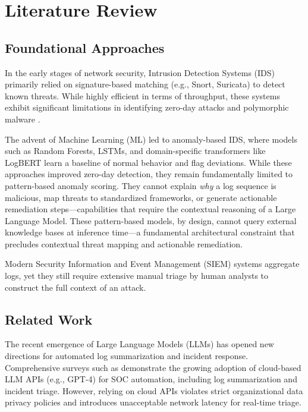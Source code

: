 \documentclass[12pt,a4paper]{article}
\begin{document}
\newpage
\section{Literature Review}

\subsection{Foundational Approaches}
In the early stages of network security, Intrusion Detection Systems (IDS) primarily relied on signature-based matching (e.g., Snort, Suricata) to detect known threats. While highly efficient in terms of throughput, these systems exhibit significant limitations in identifying zero-day attacks and polymorphic malware \cite{khraisat2019}.

The advent of Machine Learning (ML) led to anomaly-based IDS, where models such as Random Forests, LSTMs, and domain-specific transformers like LogBERT \cite{logbert2021} learn a baseline of normal behavior and flag deviations. While these approaches improved zero-day detection, they remain fundamentally limited to pattern-based anomaly scoring. They cannot explain \textit{why} a log sequence is malicious, map threats to standardized frameworks, or generate actionable remediation steps—capabilities that require the contextual reasoning of a Large Language Model. These pattern-based models, by design, cannot query external knowledge bases at inference time---a fundamental architectural constraint that precludes contextual threat mapping and actionable remediation.

Modern Security Information and Event Management (SIEM) systems aggregate logs, yet they still require extensive manual triage by human analysts to construct the full context of an attack.

\subsection{Related Work}
The recent emergence of Large Language Models (LLMs) has opened new directions for automated log summarization and incident response. Comprehensive surveys such as \cite{habibzadeh2025} demonstrate the growing adoption of cloud-based LLM APIs (e.g., GPT-4) for SOC automation, including log summarization and incident triage. However, relying on cloud APIs violates strict organizational data privacy policies and introduces unacceptable network latency for real-time triage.
\end{document}
